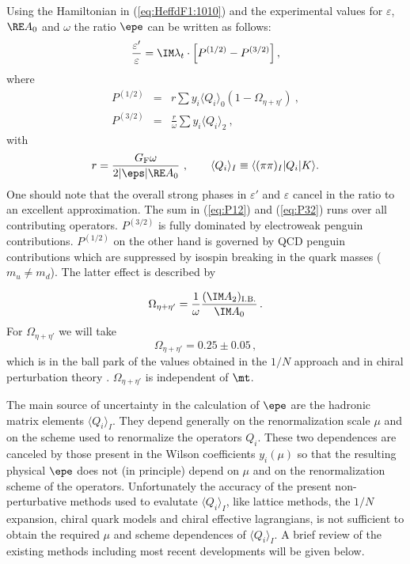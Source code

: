 Using the Hamiltonian in (\ref{eq:HeffdF1:1010}) and the experimental
values for $\varepsilon$, $\RE A_0$ and $\omega$ the ratio $\epe$ can be
written as follows:
\begin{equation}
\frac{\varepsilon'}{\varepsilon} = 
\IM \lambda_t\cdot \left[ P^{(1/2)} - P^{(3/2)} \right],
\label{eq:epe}
\end{equation}
where
\begin{eqnarray}
P^{(1/2)} & = & r \sum y_i \langle Q_i\rangle_0
(1-\Omega_{\eta+\eta'})~,
\label{eq:P12} \\
P^{(3/2)} & = &\frac{r}{\omega}
\sum y_i \langle Q_i\rangle_2~,~~~~~~
\label{eq:P32}
\end{eqnarray}
with
\begin{equation}
r = \frac{G_{\rm F} \omega}{2 |\eps| \RE A_0}~, 
\qquad
\langle Q_i\rangle_I \equiv \langle (\pi\pi)_I | Q_i | K \rangle .
\label{eq:repe}
\end{equation}
One should note that the overall strong phases in $\varepsilon'$ and 
$\varepsilon$ cancel
in the ratio to an excellent approximation.
The sum in (\ref{eq:P12}) and (\ref{eq:P32}) runs over all contributing
operators. $P^{(3/2)}$ is fully dominated by electroweak penguin
contributions. $P^{(1/2)}$ on the other hand is governed by QCD penguin
contributions which are suppressed by isospin breaking in the quark
masses ($m_u \not= m_d$). The latter effect is described by

\begin{equation}
\Omega_{\eta+\eta'} = \frac{1}{\omega} \frac{(\IM A_2)_{\rm
I.B.}}{\IM A_0}\,.
\label{eq:Omegaeta}
\end{equation}
For $\Omega_{\eta+\eta'}$ we will take
\begin{equation}
\Omega_{\eta+\eta'} = 0.25 \pm 0.05\,,
\label{eq:Omegaetadata}
\end{equation}
which is in the ball park of the values obtained in the $1/N$ approach
\cite{burasgerard:87} and in chiral perturbation theory
\cite{donoghueetal:86,lusignoli:89}. $\Omega_{\eta+\eta'}$ is
independent of $\mt$.

The main source of uncertainty in the calculation of
$\epe$ are the hadronic matrix elements $\langle Q_i \rangle_I$.
They depend generally
on the renormalization scale $\mu$ and on the scheme used to
renormalize the operators $Q_i$. These two dependences are canceled by
those present in the Wilson coefficients $y_i(\mu)$ so that the
resulting physical $\epe$ does not (in principle) depend on $\mu$ and on the
renormalization scheme of the operators.  Unfortunately the accuracy of
the present non-perturbative methods used to evalutate $\langle Q_i
\rangle_I$, like lattice methods, the $1/N$ expansion, chiral
quark models and
chiral effective lagrangians, is not
sufficient to obtain the required $\mu$ and scheme dependences of
$\langle Q_i \rangle_I$. A brief review of the existing methods 
including most recent developments will be given below.

